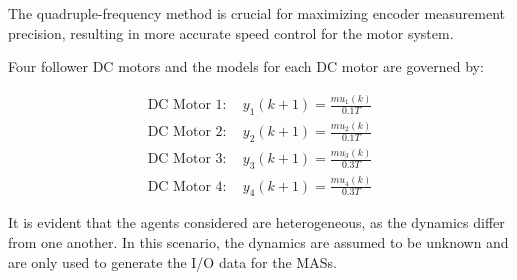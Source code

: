 \documentclass[journal,onecolumn]{IEEEtran}
\begin{document}







The quadruple-frequency method is crucial for maximizing encoder measurement precision, resulting in more accurate speed control for the motor system.

Four follower DC motors and the models for each DC motor are governed by:

\[
\begin{array}{c}
\text{DC Motor 1}: \quad y_1(k+1) = \frac{m u_1(k)}{0.1 T}\\
\text{DC Motor 2}: \quad y_2(k+1) = \frac{m u_2(k)}{0.1 T } \\
\text{DC Motor 3}: \quad y_3(k+1) = \frac{m u_3(k)}{0.3 T } \\
\text{DC Motor 4}: \quad y_4(k+1) = \frac{m u_4(k)}{0.3 T } 
\end{array}
\]


It is evident that the agents considered are heterogeneous, as the dynamics differ from one another. In this scenario, the dynamics are assumed to be unknown and are only used to generate the I/O data for the MASs. 
\end{document}

